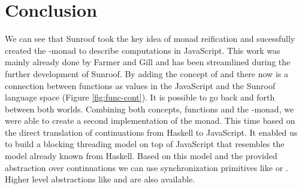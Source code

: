  
\section{Conclusion}

We can see that Sunroof took the key idea of monad reification and
sucessfully created the \JS-monad to describe computations
in JavaScript. This work was mainly already done by Farmer and
Gill \cite{Farmer:12:WebDSLs} and has been streamlined during the 
further development of Sunroof. By adding the concept 
of  and  there now is a connection between
functions as values in the JavaScript and the Sunroof language space 
(Figure \ref{fig:func-cont}). It is possible to go back and forth between 
both worlds. Combining both concepts, functions and the \JS-monad,
we were able to create a second implementation of the monad. This
time based on the direct translation of continuations from Haskell
to JavaScript. It enabled us to build a blocking threading model
on top of JavaScript that resembles the model already known from Haskell.
Based on this model and the provided abstraction over continuations
we can use synchronization primitives like  or .
Higher level abstractions like  and  are also
available. 

